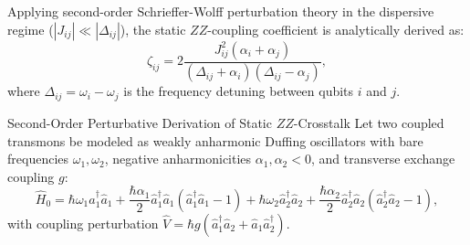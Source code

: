 Applying second-order Schrieffer-Wolff perturbation theory in the dispersive regime ($|J_{ij}| \ll |\Delta_{ij}|$), the static $ZZ$-coupling coefficient is analytically derived as:
\begin{equation}
    \zeta_{ij} = 2 \frac{J_{ij}^2 (\alpha_i + \alpha_j)}{(\Delta_{ij} + \alpha_i)(\Delta_{ij} - \alpha_j)},
    \label{eq:zz_crosstalk_full}
\end{equation}
where $\Delta_{ij} = \omega_i - \omega_j$ is the frequency detuning between qubits $i$ and $j$.

\begin{theorembox}{Second-Order Perturbative Derivation of Static $ZZ$-Crosstalk}
Let two coupled transmons be modeled as weakly anharmonic Duffing oscillators with bare frequencies $\omega_1, \omega_2$, negative anharmonicities $\alpha_1, \alpha_2 < 0$, and transverse exchange coupling $g$:
\begin{equation}
    \hat{H}_0 = \hbar \omega_1 \hat{a}_1^\dagger \hat{a}_1 + \frac{\hbar \alpha_1}{2}\hat{a}_1^\dagger \hat{a}_1(\hat{a}_1^\dagger \hat{a}_1 - 1) + \hbar \omega_2 \hat{a}_2^\dagger \hat{a}_2 + \frac{\hbar \alpha_2}{2}\hat{a}_2^\dagger \hat{a}_2(\hat{a}_2^\dagger \hat{a}_2 - 1),
\end{equation}
with coupling perturbation $\hat{V} = \hbar g (\hat{a}_1^\dagger \hat{a}_2 + \hat{a}_1 \hat{a}_2^\dagger)$.


\end{theorembox}
